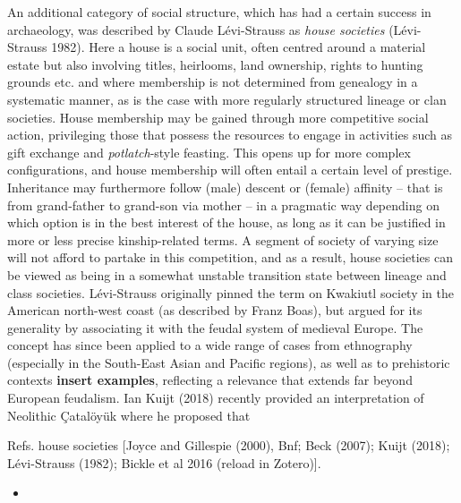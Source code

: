\documentclass[
  12pt,
  a4paper, twoside]{book}
\providecommand{\tightlist}{%
  \setlength{\itemsep}{0pt}\setlength{\parskip}{0pt}}
\begin{document}
An additional category of social structure, which has had a certain success in archaeology, was described by Claude Lévi-Strauss as \emph{house societies} (Lévi-Strauss 1982). Here a house is a social unit, often centred around a material estate but also involving titles, heirlooms, land ownership, rights to hunting grounds etc. and where membership is not determined from genealogy in a systematic manner, as is the case with more regularly structured lineage or clan societies. House membership may be gained through more competitive social action, privileging those that possess the resources to engage in activities such as gift exchange and \emph{potlatch}-style feasting. This opens up for more complex configurations, and house membership will often entail a certain level of prestige. Inheritance may furthermore follow (male) descent or (female) affinity -- that is from grand-father to grand-son via mother -- in a pragmatic way depending on which option is in the best interest of the house, as long as it can be justified in more or less precise kinship-related terms. A segment of society of varying size will not afford to partake in this competition, and as a result, house societies can be viewed as being in a somewhat unstable transition state between lineage and class societies. Lévi-Strauss originally pinned the term on Kwakiutl society in the American north-west coast (as described by Franz Boas), but argued for its generality by associating it with the feudal system of medieval Europe. The concept has since been applied to a wide range of cases from ethnography (especially in the South-East Asian and Pacific regions), as well as to prehistoric contexts \textbf{insert examples}, reflecting a relevance that extends far beyond European feudalism. Ian Kuijt (2018) recently provided an interpretation of Neolithic Çatalöyük where he proposed that

Refs. house societies {[}Joyce and Gillespie (2000), Bnf; Beck (2007); Kuijt (2018); Lévi-Strauss (1982); Bickle et al 2016 (reload in Zotero){]}.

\begin{itemize}
\tightlist
\item
\end{itemize}
\end{document}
